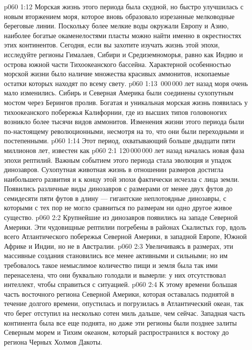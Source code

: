 \vs p060 1:12 Морская жизнь этого периода была скудной, но быстро улучшилась с новым вторжением моря, которое вновь образовало изрезанные мелководные береговые линии. Поскольку более мелкие воды окружали Европу и Азию, наиболее богатые окаменелостями пласты можно найти именно в окрестностях этих континентов. Сегодня, если вы захотите изучать жизнь этой эпохи, исследуйте регионы Гималаев, Сибири и Средиземноморья, равно как Индию и острова южной части Тихоокеанского бассейна. Характерной особенностью морской жизни было наличие множества красивых аммонитов, ископаемые остатки которых находят по всему свету.
\vs p060 1:13 \,000\,000 лет назад моря очень мало изменились. Сибирь и Северная Америка были соединены сухопутным мостом через Берингов пролив. Богатая и уникальная морская жизнь появилась у тихоокеанского побережья Калифорнии, где из высших типов головоногих возникло более тысячи видов аммонитов. Изменения жизни этого периода были по\hyp{}настоящему революционными, несмотря на то, что они были переходными и постепенными.
\vs p060 1:14 \pc Этот период, охватывающий больше двадцати пяти миллионов лет, известен как 
\vs p060 2:1 120\,000\,000 лет назад началась новая фаза эпохи рептилий. Важным событием этого периода стала эволюция и упадок динозавров. Сухопутная животная жизнь в отношении размеров достигла наибольшего развития и к концу этой эпохи фактически исчезла с лица земли. Появились различные виды динозавров с размерами от менее двух футов до семидесяти пяти футов в длину --- гигантские неплотоядные динозавры, с которыми с тех пор не могло сравниться по размерам ни одно другое живое существо.
\vs p060 2:2 Крупнейшие из динозавров появились на западе Северной Америки. Эти чудовищные рептилии погребены в районах Скалистых гор, вдоль всего Атлантического побережья Северной Америки, в западной Европе, Южной Африке и Индии, но не в Австралии.
\vs p060 2:3 Увеличиваясь в размерах, эти массивные создания становились все менее активными и сильными; но им требовалось такое немыслимое количество пищи и земля была так ими перенаселена, что они буквально голодали и вымерли: у них отсутствовал интеллект, чтобы справиться с ситуацией.
\vs p060 2:4 К этому времени большая часть восточного региона Северной Америки, которая оставалась поднятой в течение долгого времени, опустилась и погрузилась в Атлантический океан, так что берег отступил на несколько сотен миль дальше, чем сейчас. Западная часть континента была все еще поднята, но даже эти регионы были позднее залиты Северным морем и Тихим океаном, который распространился к востоку до региона Черных Холмов Дакоты.
